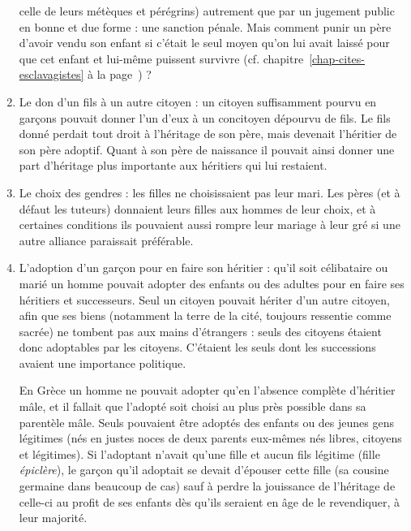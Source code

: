 \begin{enumerate}
celle de leurs métèques et pérégrins) autrement que par un jugement public
en bonne et due forme : une sanction pénale. Mais comment punir
un père d'avoir vendu son enfant si c'était le seul moyen qu'on lui avait
laissé pour que cet enfant et lui-même puissent survivre (cf. chapitre~\ref{chap-cites-esclavagistes} à la page~\pageref{chap-cites-esclavagistes}) ?
\item Le don d'un fils à un autre citoyen : un citoyen suffisamment
pourvu en garçons pouvait donner l'un d'eux à un concitoyen dépourvu
de fils. Le fils donné perdait tout droit à l'héritage de son père, mais devenait
l'héritier de son père adoptif. Quant à son père de naissance il
pouvait ainsi donner une part d'héritage plus importante aux héritiers qui
lui restaient.
\item Le choix des gendres : les filles ne choisissaient pas leur mari.
Les pères (et à défaut les tuteurs) donnaient leurs filles aux hommes de
leur choix, et à certaines conditions ils pouvaient aussi rompre leur mariage
à leur gré si une autre alliance paraissait préférable.
\item L'adoption d'un garçon pour en faire son héritier : qu'il soit célibataire
ou marié un homme pouvait adopter des enfants ou des adultes
pour en faire ses héritiers et successeurs. Seul un citoyen pouvait hériter
d'un autre citoyen, afin que ses biens (notamment la terre de la cité, toujours
ressentie comme sacrée) ne tombent pas aux mains d'étrangers :
seuls des citoyens étaient donc adoptables par les citoyens. C'étaient les
seuls dont les successions avaient une importance politique.

En Grèce un homme ne pouvait adopter qu'en l'absence complète
d'héritier mâle, et il fallait que l'adopté soit choisi au plus près possible
dans sa parentèle mâle. Seuls pouvaient être adoptés des enfants ou des
jeunes gens légitimes (nés en justes noces de deux parents eux-mêmes
nés libres, citoyens et légitimes). Si l'adoptant n'avait qu'une fille et aucun
fils légitime (fille \emph{épiclère}), le garçon qu'il adoptait se devait d'épouser cette
fille (sa cousine germaine dans beaucoup de cas) sauf à perdre la jouissance
de l'héritage de celle-ci au profit de ses enfants dès qu'ils seraient
en âge de le revendiquer, à leur majorité.


\end{enumerate}
